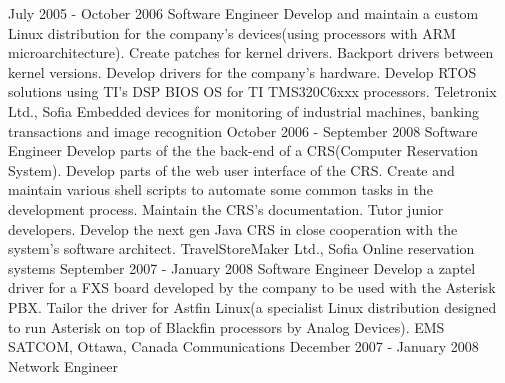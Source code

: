 \ecvitem{}{} %
\ecvitem{}{} %
{
  July 2005 - October 2006
}
{
  Software Engineer
}
{
  Develop and maintain a custom Linux distribution for
  the company's devices(using processors with ARM microarchitecture). Create patches for kernel
  drivers. Backport drivers between kernel versions. Develop drivers for the company's hardware.
  Develop RTOS solutions using TI's DSP BIOS OS for TI TMS320C6xxx processors.
}
{
  Teletronix Ltd., Sofia
}
{
  Embedded devices for monitoring of industrial machines, banking
  transactions and image recognition
}
\ecvitem{}{} %
\ecvitem{}{} %
{
  October 2006 - September 2008
}
{
  Software Engineer
}
{
  Develop parts of the the back-end of a CRS(Computer
  Reservation System). Develop parts of the web user interface of the CRS. Create and maintain
  various shell scripts to automate some common tasks in the development process. Maintain the
  CRS's documentation. Tutor junior developers. Develop the next gen Java CRS in close cooperation
  with the system's software architect.
}
{
  TravelStoreMaker Ltd., Sofia
}
{
  Online reservation systems
}
\ecvitem{}{} %
\ecvitem{}{} %
{
  September 2007 - January 2008
}
{
  Software Engineer
}
{
  Develop a zaptel driver for a FXS board developed by
  the company to be used with the Asterisk PBX. Tailor the driver for Astfin Linux(a specialist Linux
  distribution designed to run Asterisk on top of Blackfin processors by Analog Devices).
}
{
  EMS SATCOM, Ottawa, Canada
}
{
  Communications
}
\ecvitem{}{} %
\ecvitem{}{} %
{
  December 2007 - January 2008
}
{
  Network Engineer
}
